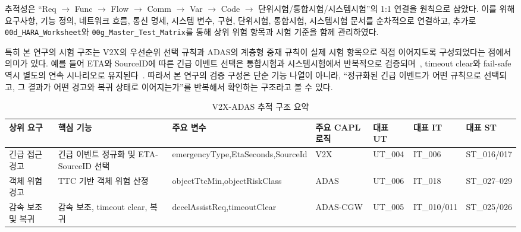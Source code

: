 \documentclass[10pt,a4paper,twocolumn]{article}
\begin{document}
추적성은 ``Req $\rightarrow$ Func $\rightarrow$ Flow $\rightarrow$ Comm $\rightarrow$ Var $\rightarrow$ Code $\rightarrow$ 단위시험/통합시험/시스템시험''의 1:1 연결을 원칙으로 삼았다. 이를 위해 요구사항, 기능 정의, 네트워크 흐름, 통신 명세, 시스템 변수, 구현, 단위시험, 통합시험, 시스템시험 문서를 순차적으로 연결하고, 추가로 \texttt{00d\_HARA\_Worksheet}와 \texttt{00g\_Master\_Test\_Matrix}를 통해 상위 위험 항목과 시험 기준을 함께 관리하였다.

특히 본 연구의 시험 구조는 V2X의 우선순위 선택 규칙과 ADAS의 계층형 중재 규칙이 실제 시험 항목으로 직접 이어지도록 구성되었다는 점에서 의미가 있다. 예를 들어 ETA와 SourceID에 따른 긴급 이벤트 선택은 통합시험과 시스템시험에서 반복적으로 검증되며~\cite{integration_test,system_test}, timeout clear와 fail-safe 역시 별도의 연속 시나리오로 유지된다~\cite{integration_test,master_test_matrix,system_test}. 따라서 본 연구의 검증 구성은 단순 기능 나열이 아니라, ``정규화된 긴급 이벤트가 어떤 규칙으로 선택되고, 그 결과가 어떤 경고와 복귀 상태로 이어지는가''를 반복해서 확인하는 구조라고 볼 수 있다.

\begin{table}[t]
\caption{V2X-ADAS 추적 구조 요약}
\label{tab:traceability}
\centering
\footnotesize
\setlength{\tabcolsep}{4pt}
\begin{tabularx}{\textwidth}{>{\raggedright\arraybackslash}p{2.2cm} >{\raggedright\arraybackslash}p{2.7cm} >{\raggedright\arraybackslash}p{3.2cm} >{\raggedright\arraybackslash}p{2.1cm} >{\raggedright\arraybackslash}p{1.9cm} >{\raggedright\arraybackslash}p{1.9cm} >{\raggedright\arraybackslash}X}
\toprule
상위 요구 & 핵심 기능 & 주요 변수 & 주요 CAPL 로직 & 대표 UT & 대표 IT & 대표 ST \\
\midrule
긴급 접근 경고 & 긴급 이벤트 정규화 및 ETA-SourceID 선택 & emergencyType,\newline EtaSeconds,\newline SourceId & V2X & UT\_004 & IT\_006 & ST\_016/017 \\
객체 위험 경고 & TTC 기반 객체 위험 산정 & objectTtcMin,\newline objectRiskClass & ADAS & UT\_006 & IT\_018 & ST\_027--029 \\
감속 보조 및 복귀 & 감속 보조, timeout clear, 복귀 & decelAssistReq,\newline timeoutClear & ADAS-CGW & UT\_005 & IT\_010/011 & ST\_025/026 \\
\bottomrule
\end{tabularx}
\end{table}
\end{document}
